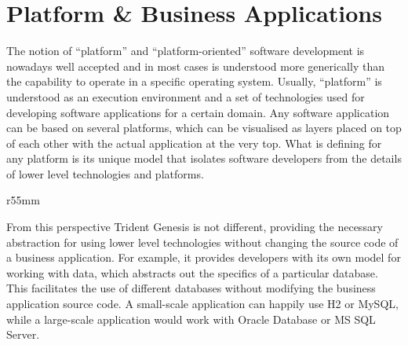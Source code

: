\section{Platform \& Business Applications}\label{sec:02}  

  The notion of ``platform'' and ``platform-oriented'' software development is nowadays well accepted and in most cases is understood more generically than the capability to operate in a specific operating system.
  Usually, ``platform'' is understood as an execution environment and a set of technologies used for developing software applications for a certain domain.
  Any software application can be based on several platforms, which can be visualised as layers placed on top of each other with the actual application at the very top.
  What is defining for any platform is its unique model that isolates software developers from the details of lower level technologies and platforms.

  \begin{wrapfigure}{r}{55mm}
    \centering    
  \end{wrapfigure}
  
  From this perspective Trident Genesis is not different, providing the necessary abstraction for using lower level technologies without changing the source code of a business application.
  For example, it provides developers with its own model for working with data, which abstracts out the specifics of a particular database.
  This facilitates the use of different databases without modifying the business application source code.
  A small-scale application can happily use H2 or MySQL, while a large-scale application would work with Oracle Database or MS SQL Server.

